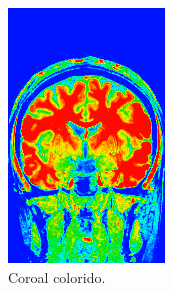 \documentclass{article}
\begin{document}
\begin{figure}[h]
\begin{subfigure}[b]{0.3\textwidth}
        \includegraphics[width=\textwidth]{brain/neuroradiologist-coronal.png}
        \caption{Coroal colorido.}
    \end{subfigure}
    ~
    \begin{subfigure}[b]{0.3\textwidth}

\end{subfigure}
\end{figure}
\end{document}

